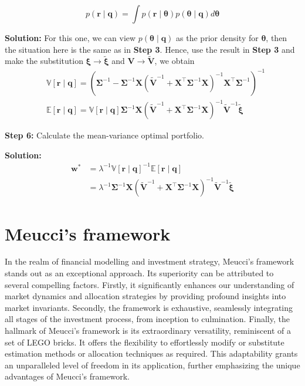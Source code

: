 \documentclass[13pt]{article}
\theoremstyle{definition}
\newenvironment{solution}
{\color{C2}\begin{framed}\begingroup\textbf{Solution:} }
  {\endgroup\end{framed}}
\theoremstyle{remark}
\begin{document}
\begin{enumerate}
$$
p(\boldsymbol{r} \mid \boldsymbol{q})=\int p(\boldsymbol{r} \mid \boldsymbol{\theta}) p(\boldsymbol{\theta} \mid \boldsymbol{q}) d \boldsymbol{\theta}
$$
\begin{solution}
    For this one, we can view $p(\boldsymbol{\theta} \mid \boldsymbol{q})$ as the prior density for $\bm{\theta}$, then the situation here is the same as in {\color{C6}\textbf{Step 3}}. Hence, use the result in {\color{C6}\textbf{Step 3}} and make the substitution $\boldsymbol{\xi} \rightarrow \widetilde{\boldsymbol{\xi}}$ and $\boldsymbol{V} \rightarrow \widetilde{\boldsymbol{V}}$, we obtain
$$
\begin{aligned}
& \mathbb{V}[\boldsymbol{r} \mid \boldsymbol{q}]=\left(\boldsymbol{\Sigma}^{-1}-\boldsymbol{\Sigma}^{-1} \boldsymbol{X}\left(\widetilde{\boldsymbol{V}}^{-1}+\boldsymbol{X}^{\top} \boldsymbol{\Sigma}^{-1} \boldsymbol{X}\right)^{-1} \boldsymbol{X}^{\top} \boldsymbol{\Sigma}^{-1}\right)^{-1} \\
& \mathbb{E}[\boldsymbol{r} \mid \boldsymbol{q}]=\mathbb{V}[\boldsymbol{r} \mid \boldsymbol{q}] \boldsymbol{\Sigma}^{-1} \boldsymbol{X}\left(\widetilde{\boldsymbol{V}}^{-1}+\boldsymbol{X}^{\top} \boldsymbol{\Sigma}^{-1} \boldsymbol{X}\right)^{-1} \widetilde{\boldsymbol{V}}^{-1} \widetilde{\boldsymbol{\xi}}
\end{aligned}
$$
\end{solution}
\end{enumerate}

{\color{C6}\textbf{Step 6:} Calculate the mean-variance optimal portfolio.}

\begin{solution}
\begin{align*}
\bm{w}^*
&=\lambda^{-1} \mathbb{V}[\boldsymbol{r} \mid \boldsymbol{q}]^{-1} \mathbb{E}[\boldsymbol{r} \mid \boldsymbol{q}]\\
&=\lambda^{-1}\boldsymbol{\Sigma}^{-1} \boldsymbol{X}\left(\widetilde{\boldsymbol{V}}^{-1}+\boldsymbol{X}^{\top} \boldsymbol{\Sigma}^{-1} \boldsymbol{X}\right)^{-1} \widetilde{\boldsymbol{V}}^{-1} \widetilde{\boldsymbol{\xi}}
\end{align*}
\end{solution}

\newpage
\section{Meucci's framework}
In the realm of financial modelling and investment strategy, Meucci's framework stands out as an exceptional approach. Its superiority can be attributed to several compelling factors. Firstly, it significantly enhances our understanding of market dynamics and allocation strategies by providing profound insights into market invariants. Secondly, the framework is exhaustive, seamlessly integrating all stages of the investment process, from inception to culmination. Finally, the hallmark of Meucci's framework is its extraordinary versatility, reminiscent of a set of LEGO bricks. It offers the flexibility to effortlessly modify or substitute estimation methods or allocation techniques as required. This adaptability grants an unparalleled level of freedom in its application, further emphasizing the unique advantages of Meucci's framework.
\end{document}
